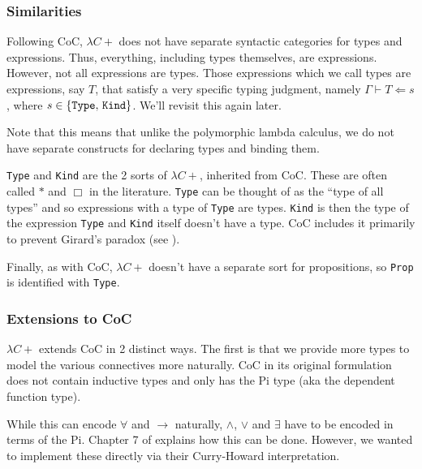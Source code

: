 \documentclass{article}
\begin{document}
\subsubsection{Similarities}
Following CoC, $\lambda C+$ does not have separate syntactic categories for types
and expressions. Thus, everything, including types themselves, are expressions.
However, not all expressions are types.
Those expressions which we call types are expressions, say $T$, that satisfy
a very specific typing judgment, namely $\Gamma \vdash T \Leftarrow s$,
where $s \in \{ \texttt{Type}, \, \texttt{Kind} \}$. We'll revisit this again later.

Note that this means that unlike the polymorphic lambda calculus, we do not have
separate constructs for declaring types and binding them.

\texttt{Type} and \texttt{Kind} are the 2 sorts of $\lambda C+$, inherited from
CoC. These are often called $*$ and $\Box$ in the literature.
\texttt{Type} can be thought of as the ``type of all types'' and so expressions
with a type of \texttt{Type} are types.
\texttt{Kind} is then the type of the expression \texttt{Type} and
\texttt{Kind} itself doesn't have a type.
CoC includes it primarily to prevent Girard's paradox
(see \cite{analysis_of_girard}).

Finally, as with CoC, $\lambda C+$ doesn't have a separate sort for
propositions, so \texttt{Prop} is identified with \texttt{Type}.
  

\subsubsection{Extensions to CoC}
$\lambda C+$ extends CoC in 2 distinct ways. The first is that we provide more
types to model the various connectives more naturally.
CoC in its original formulation does not contain inductive types and only has
the Pi type (aka the dependent function type).

While this can encode $\forall$ and $\rightarrow$ naturally, $\wedge$, $\vee$ and
$\exists$ have to be encoded in terms of the Pi.
Chapter 7 of \cite{type_theory_and_formal_proof} explains how this can
be done.
However, we wanted to implement these directly via their Curry-Howard
interpretation.
\end{document}
